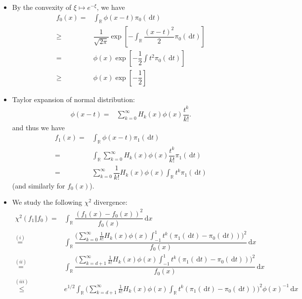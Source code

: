 \documentclass[11pt,a4paper]{article}
\numberwithin{equation}{section}%
\begin{document}
\begin{itemize}[topsep=2pt,itemsep=0pt]
    \item By the convexity of $ \xi \mapsto e^{-\xi } $, we have
    \begin{align*}
        f_0(x) =&\int_\mathbb{R} \phi (x-t) \pi_0(\,\mathrm{d}t) \\
        \geq&\dfrac{ 1 }{ \sqrt{2\pi} }\exp\left[ -\int_\mathbb{R} \dfrac{ (x-t)^2 }{ 2 }\pi_0(\,\mathrm{d}t)  \right] \\
        =& \phi (x)\exp\left[ -\dfrac{ 1 }{ 2 } \int t^2 \pi_0(\,\mathrm{d}t)  \right]\\
        \geq&\phi (x)\exp\left[ -\dfrac{ 1 }{ 2 } \right]
    \end{align*}
    \item Taylor expansion of normal distribution:
    \begin{align*}
        \phi (x-t)=&\sum_{k=0}^\infty H_k(x)\phi (x) \dfrac{ t^k }{ k! }.  
    \end{align*}
    and thus we have
    \begin{align*}
        f_1(x)=&\int_\mathbb{R} \phi (x-t) \pi_1(\,\mathrm{d}t) \\
        =&\int_\mathbb{R} \sum_{k=0}^\infty H_k(x)\phi (x) \dfrac{ t^k }{ k! } \pi_1(\,\mathrm{d}t) \\
        =&\sum_{k=0}^\infty \dfrac{ 1 }{ k! }  H_k(x)\phi (x)\int_\mathbb{R}  t^k \pi_1(\,\mathrm{d}t)
    \end{align*}
    (and similarly for $ f_0(x) $).
    \item We study the following $ \chi^2 $ divergence:
    \begin{align*}
        \chi^2(f_1\big\Vert f_0) =&\int_\mathbb{R} \dfrac{ (f_1(x)-f_0(x))^2 }{ f_0(x) }\,\mathrm{d}x\\
        \mathop{ = }\limits^{(i)} &\int_\mathbb{R} \dfrac{ \big( \sum_{k=0}^\infty \frac{ 1 }{ k! }  H_k(x)\phi (x) \int_{-1}^1  t^k (\pi_1(\,\mathrm{d}t) - \pi_0(\,\mathrm{d}t) )  \big)^2 }{ f_0(x) }\,\mathrm{d}x\\ 
        \mathop{ = }\limits^{(ii)}&\int_\mathbb{R} \dfrac{ \big( \sum_{k=d+1}^\infty \frac{ 1 }{ k! }  H_k(x)\phi (x) \int_{-1}^1  t^k (\pi_1(\,\mathrm{d}t) - \pi_0(\,\mathrm{d}t) )  \big)^2 }{ f_0(x) }\,\mathrm{d}x\\ 
        \mathop{ \leq }\limits^{(iii)}&e^{1/2}\int_\mathbb{R}  \big( \sum_{k=d+1}^\infty \frac{ 1 }{ k! }  H_k(x)\phi (x) \int_\mathbb{R}  t^k (\pi_1(\,\mathrm{d}t) - \pi_0(\,\mathrm{d}t) )  \big)^2\phi (x)^{-1} \,\mathrm{d}x\\

\end{align*}
\end{itemize}
\end{document}
